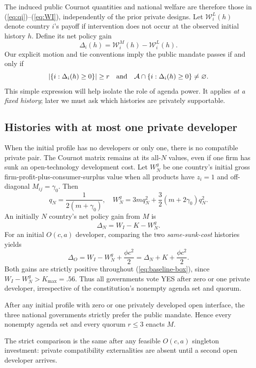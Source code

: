 The induced public Cournot quantities and national welfare are therefore those in (\ref{eq:qi})--(\ref{eq:WI}), independently of the prior private designs. Let \(\mathcal W_i^L(h)\) denote country \(i\)'s payoff if intervention does not occur at the observed initial history \(h\). Define its net policy gain
\begin{equation}
 \Delta_i(h)=\mathcal W_i^M(h)-\mathcal W_i^L(h).
 \label{eq:policy-gain}
\end{equation}
Our explicit motion and tie conventions imply the public mandate passes if and only if
\begin{equation}
 \left|\{i:\Delta_i(h)\ge0\}\right|\ge r
 \quad\text{and}\quad
 \mathcal{A}\cap\{i:\Delta_i(h)\ge0\}\ne\varnothing.
 \label{eq:vote-rule}
\end{equation}
This simple expression will help isolate the role of agenda power. It applies \emph{at a fixed history}; later we must ask which histories are privately supportable.

\subsection{Histories with at most one private developer}\label{subsec:zero-one}

When the initial profile has no developers or only one, there is no compatible private pair. The Cournot matrix remains at its all-\(N\) values, even if one firm has sunk an open-technology development cost. Let \(W_N^g\) be one country's initial gross firm-profit-plus-consumer-surplus value when all products have \(z_i=1\) and off-diagonal \(M_{ij}=\gamma_0\). Then
\begin{equation}
 q_N=\frac{1}{2(m+\gamma_0)},\quad
 W_N^g=3m q_N^2+
 \frac{3}{2}(m+2\gamma_0)q_N^2.
 \label{eq:WN}
\end{equation}
An initially \(N\) country's net policy gain from \(M\) is
\[
 \Delta_N=W_I-K-W_N^g.
\]
For an initial \(O(c,a)\) developer, comparing the two \emph{same-sunk-cost} histories yields
\[
 \Delta_O=W_I-W_N^g+\frac{\phi c^2}{2}
         =\Delta_N+K+\frac{\phi c^2}{2}.
\]
Both gains are strictly positive throughout (\ref{eq:baseline-box}), since \(W_I-W_N^g>K_{\max}=.56\). Thus all governments vote YES after zero or one private developer, irrespective of the constitution's nonempty agenda set and quorum.

\begin{lemma}
\label{lem:sparse}
After any initial profile with zero or one privately developed open
interface, the three national governments strictly prefer the public
mandate. Hence every nonempty agenda set and every quorum \(r\le3\)
enacts \(M\).
\end{lemma}
The strict comparison is the same after any feasible \(O(c,a)\)
singleton investment: private compatibility externalities are absent
until a second open developer arrives.

